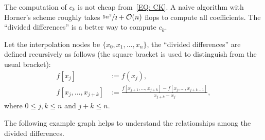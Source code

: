 \begin{remark}
    The computation of $c_k$ is not cheap from~\eqref{EQ: CK}. A naive algorithm with Horner's scheme roughly takes $\sfrac{5n^2}{2}+\mathcal O(n)$ flops to compute all coefficients. The ``divided differences'' is a better way to compute $c_k$.
\end{remark}
\begin{definition}
    Let the interpolation nodes be $\{x_0, x_1, \dots, x_n\}$, the ``divided differences'' are defined recursively as follows (the square bracket is used to distinguish from the usual bracket): 
    \begin{equation}
        \begin{aligned}
            f[x_j] &:= f(x_j),\\
        f[x_{j}, \dots, x_{j+k}] &:= \frac{f[x_{j+1},\dots, x_{j+k}] - f[x_j,\dots, x_{j+k-1}]}{x_{j+k} - x_{j}},
        \end{aligned}
    \end{equation}
    where $0\le j, k\le n$ and $j+k\le n$.
\end{definition}
The following example graph helps to understand the relationships among the divided differences. 

